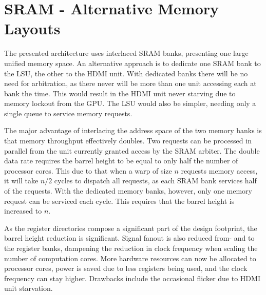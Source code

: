 \section{SRAM - Alternative Memory Layouts}

The presented architecture uses interlaced SRAM banks, presenting one large unified memory space.
An alternative approach is to dedicate one SRAM bank to the LSU, the other to the HDMI unit.
With dedicated banks there will be no need for arbitration, as there never will be more than one unit accessing each at bank the time.
This would result in the HDMI unit never starving due to memory lockout from the GPU.
The LSU would also be simpler, needing only a single queue to service memory requests.

The major advantage of interlacing the address space of the two memory banks is that memory throughput effectively doubles.
Two requests can be processed in parallel from the unit currently granted access by the SRAM arbiter.
The double data rate requires the barrel height to be equal to only half the number of processor cores.
This due to that when a warp of size $n$ requests memory access, it will take $n/2$ cycles to dispatch all requests, as each SRAM bank services half of the requests.
With the dedicated memory banks, however, only one memory request can be serviced each cycle.
This requires that the barrel height is increased to $n$.

As the register directories compose a significant part of the design footprint, the barrel height reduction is significant.
Signal fanout is also reduced from- and to the register banks, dampening the reduction in clock frequency when scaling the number of computation cores.
More hardware resources can now be allocated to processor cores, power is saved due to less registers being used, and the clock frequency can stay higher.
Drawbacks include the occasional flicker due to HDMI unit starvation.
